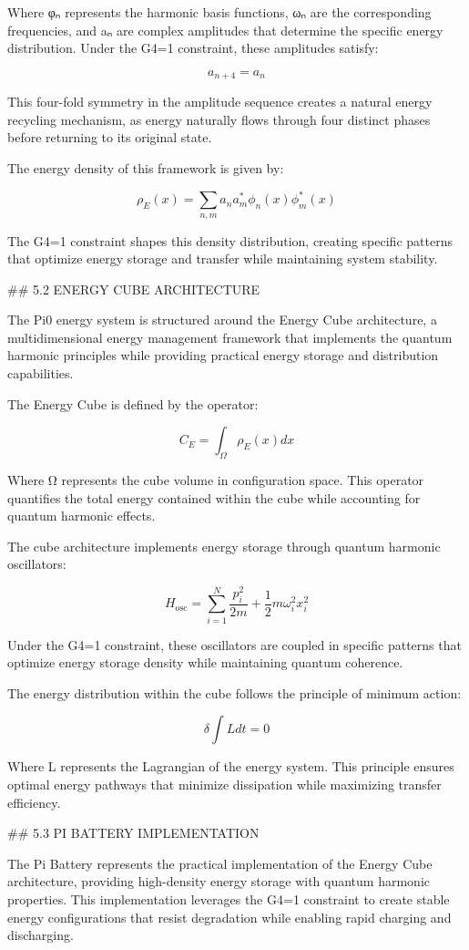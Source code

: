 Where φₙ represents the harmonic basis functions, ωₙ are the corresponding frequencies, and aₙ are complex amplitudes that determine the specific energy distribution. Under the G4=1 constraint, these amplitudes satisfy:

$$a_{n+4} = a_n$$

This four-fold symmetry in the amplitude sequence creates a natural energy recycling mechanism, as energy naturally flows through four distinct phases before returning to its original state.

The energy density of this framework is given by:

$$\rho_E(x) = \sum_{n,m} a_n a_m^* \phi_n(x) \phi_m^*(x)$$

The G4=1 constraint shapes this density distribution, creating specific patterns that optimize energy storage and transfer while maintaining system stability.

## 5.2 ENERGY CUBE ARCHITECTURE

The Pi0 energy system is structured around the Energy Cube architecture, a multidimensional energy management framework that implements the quantum harmonic principles while providing practical energy storage and distribution capabilities.

The Energy Cube is defined by the operator:

$$C_E = \int_{\Omega} \rho_E(x) dx$$

Where Ω represents the cube volume in configuration space. This operator quantifies the total energy contained within the cube while accounting for quantum harmonic effects.

The cube architecture implements energy storage through quantum harmonic oscillators:

$$H_{\text{osc}} = \sum_{i=1}^N \frac{p_i^2}{2m} + \frac{1}{2}m\omega_i^2 x_i^2$$

Under the G4=1 constraint, these oscillators are coupled in specific patterns that optimize energy storage density while maintaining quantum coherence.

The energy distribution within the cube follows the principle of minimum action:

$$\delta \int L dt = 0$$

Where L represents the Lagrangian of the energy system. This principle ensures optimal energy pathways that minimize dissipation while maximizing transfer efficiency.

## 5.3 PI BATTERY IMPLEMENTATION

The Pi Battery represents the practical implementation of the Energy Cube architecture, providing high-density energy storage with quantum harmonic properties. This implementation leverages the G4=1 constraint to create stable energy configurations that resist degradation while enabling rapid charging and discharging.

